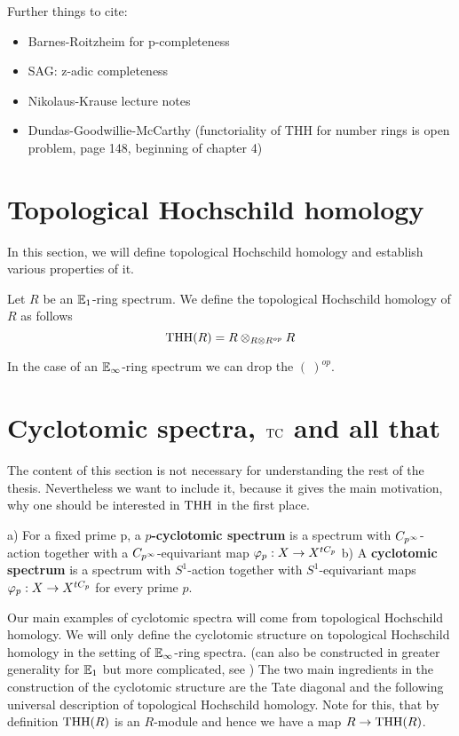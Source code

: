Further things to cite:
\begin{itemize}
    \item Barnes-Roitzheim for p-completeness \cite[Section~8.4.1]{barnesroitzheim}
    \item SAG: z-adic completeness \cite[Section~7.3]{SAG}
    
    \item Nikolaus-Krause lecture notes 
    \item Dundas-Goodwillie-McCarthy (functoriality of THH for number rings is open problem, page 148, beginning of chapter 4)
\end{itemize}
\section{Topological Hochschild homology}
In this section, we will define topological Hochschild homology and establish various properties of it.

\begin{defn}
    Let $R$ be an $\mathbb{E}_1$-ring spectrum.
    We define the topological Hochschild homology of $R$ as follows
    \begin{equation*}
        \operatorname{THH}(R)=R\otimes_{R\otimes R^{op}}R
    \end{equation*}
    \end{defn}
    In the case of an $\mathbb{E}_\infty$-ring spectrum we can drop the $(\:)^{op}$. 

\section{Cyclotomic spectra, $\operatorname{TC}$ and all that}
The content of this section is not necessary for understanding the rest of the thesis. Nevertheless we want to include it, because it gives the main motivation, why one should be interested in $\operatorname{THH}$ in the first place. 



\begin{defn}\cite[Chapter~2.1]{NS}
a) For a fixed prime p, a \textbf{$p$-cyclotomic spectrum} is a spectrum with $C_{p^\infty}$-action together with a $C_{p^\infty}$-equivariant map $\varphi_p: X \rightarrow X^{tC_p}$ \newline
b) A \textbf{cyclotomic spectrum} is a spectrum with $S^1$-action together with  $S^1$-equivariant maps $\varphi_p: X \rightarrow X^{tC_p}$ for every prime $p$.
\end{defn}

Our main examples of cyclotomic spectra will come from topological Hochschild homology.
We will only define the cyclotomic structure on topological Hochschild homology in the setting of $\mathbb{E}_\infty$-ring spectra. (can also be constructed in greater generality for $\mathbb{E}_1$ but more complicated, see \cite[Chapter~3.1]{NS})
The two main ingredients in the construction of the cyclotomic structure are the Tate diagonal and the following universal description of topological Hochschild homology. Note for this, that by definition $\operatorname{THH}(R)$ is an $R$-module and hence we have a map $R\rightarrow\operatorname{THH}(R)$.

